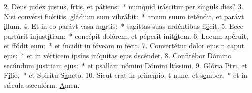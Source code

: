 2. Deus judex justus, frtis, et p\uline{á}tiens:~* numquid iráscitur per sínguls d\uline{i}es?
3. Nisi convérsi fuéritis, gládium sum vibr\uline{á}bit:~* arcum suum teténdit, et parávt \uline{i}llum.
4. Et in eo parávt vasa m\uline{o}rtis:~* sagíttas suas ardéntibus ff\uline{é}cit.
5. Ecce partúrit injust\uline{í}tiam:~* concépit dolórem, et péperit init\uline{á}tem.
6. Lacum apéruit, et ffódit \uline{e}um:~* et íncidit in fóveam m f\uline{e}cit.
7. Convertétur dolor ejus n caput \uline{e}jus:~* et in vérticem ipsíus iníquitas ejus dsc\uline{é}ndet.
8. Confitébor Dómino secúndum justtiam \uline{e}jus:~* et psallam nómini Dómini lt\uline{í}ssimi.
9. Glória Ptri, et F\uline{í}lio,~* et Spirítu S\uline{a}ncto.
10. Sicut erat in princípio, t nunc, et s\uline{e}mper,~* et in sǽcula sæculórm. \uline{A}men.

